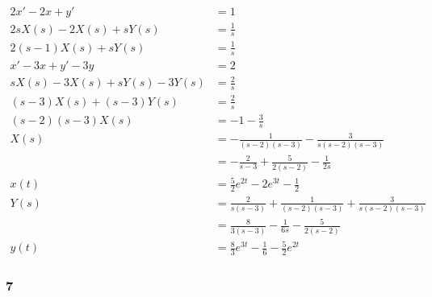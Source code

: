 \documentclass{article}
\begin{document}
\begin{align*}
  2 x' - 2 x + y'                   & = 1                                                                             \\
  2 s X(s) - 2 X(s) + s Y(s)        & = \frac{1}{s}                                                                   \\
  2 (s - 1) X(s) + s Y(s)           & = \frac{1}{s}                                                                   \\
  x' - 3 x + y' - 3 y               & = 2                                                                             \\
  s X(s) - 3 X(s) + s Y(s) - 3 Y(s) & = \frac{2}{s}                                                                   \\
  (s - 3) X(s) + (s - 3) Y(s)       & = \frac{2}{s}                                                                   \\
  (s - 2) (s - 3) X(s)              & = -1 - \frac{3}{s}                                                              \\
  X(s)                              & = -\frac{1}{(s - 2) (s - 3)} - \frac{3}{s (s - 2) (s - 3)}                      \\
                                    & = -\frac{2}{s - 3} + \frac{5}{2 (s - 2)} - \frac{1}{2 s}                        \\
  x(t)                              & = \frac{5}{2} e^{2 t} - 2 e^{3 t} - \frac{1}{2}                                 \\
  Y(s)                              & = \frac{2}{s (s - 3)} + \frac{1}{(s - 2) (s - 3)} + \frac{3}{s (s - 2) (s - 3)} \\
                                    & = \frac{8}{3 (s - 3)} - \frac{1}{6 s} - \frac{5}{2 (s - 2)}                     \\
  y(t)                              & = \frac{8}{3} e^{3 t} - \frac{1}{6} - \frac{5}{2} e^{2 t}
\end{align*}

\subsubsection{7}
\end{document}
